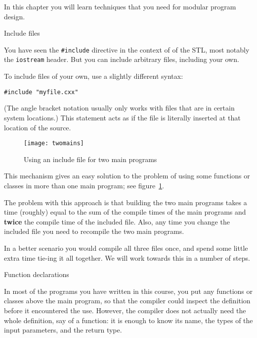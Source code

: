 
In this chapter you will learn techniques
that you need for modular program design.

 {Include files}

You have seen the \lstinline+#include+ directive
in the context of 
of the \ac{STL}, most notably the \lstinline{iostream} header.
But you can include arbitrary files, including your own.

To include files of your own, use a slightly different syntax:
\begin{lstlisting}
#include "myfile.cxx"
\end{lstlisting}
(The angle bracket notation usually only works
with files that are in certain system locations.)
This statement acts as if the file
is literally inserted at that location of the source.

\begin{figure}[ht]
  \texttt{[image: twomains]}
  \caption{Using an include file for two main programs}
  \label{fig:twomains}
\end{figure}
This mechanism gives an easy solution to the problem
of using some functions or classes in more than one main program;
see figure~\ref{fig:twomains}.

The problem with this approach is that building the two main programs
takes a time (roughly) equal to
the sum of the compile times of the main programs
and \textbf{twice} the compile time of the included file.
Also, any time you change the included file
you need to recompile the two main programs.

In a better scenario you would compile all three files once,
and spend some little extra time tie-ing it all together.
We will work towards this in a number of steps.

 {Function declarations}
\label{sec:proto}

In most of the programs you have written in this course, you put any
functions or classes above the main program, so that the compiler
could inspect the definition before it encountered the use. However,
the compiler does not actually need the whole definition, say of a
function: it is enough to know its name, the types of the input
parameters, and the return type.

